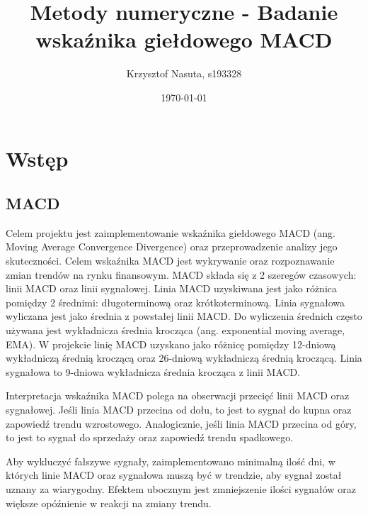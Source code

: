 \documentclass[12pt, a4paper]{article}
\title{Metody numeryczne - Badanie wskaźnika giełdowego MACD}
\author{Krzysztof Nasuta, s193328}
\date{\today}
\begin{document}
\maketitle

\section{Wstęp}

\subsection{MACD}
Celem projektu jest zaimplementowanie wskaźnika giełdowego MACD (ang. Moving Average Convergence Divergence)
oraz przeprowadzenie analizy jego skuteczności. Celem wskaźnika MACD jest wykrywanie oraz rozpoznawanie
zmian trendów na rynku finansowym. MACD składa się z 2 szeregów czasowych: linii MACD oraz linii sygnałowej.
Linia MACD uzyskiwana jest jako różnica pomiędzy 2 średnimi: długoterminową oraz krótkoterminową.
Linia sygnałowa wyliczana jest jako średnia z powstałej linii MACD. Do wyliczenia średnich często
używana jest wykładnicza średnia krocząca (ang. exponential moving average, EMA). W projekcie linię MACD uzyskano jako różnicę
pomiędzy 12-dniową wykładniczą średnią kroczącą oraz 26-dniową wykładniczą średnią kroczącą. Linia sygnałowa to 
9-dniowa wykładnicza średnia krocząca z linii MACD.

Interpretacja wskaźnika MACD polega na obserwacji przecięć linii MACD oraz sygnałowej. Jeśli linia MACD przecina od dołu,
to jest to sygnał do kupna oraz zapowiedź trendu wzrostowego. Analogicznie, jeśli linia MACD przecina od góry, to jest to sygnał
do sprzedaży oraz zapowiedź trendu spadkowego. 

Aby wykluczyć fałszywe sygnały, zaimplementowano minimalną ilość dni, w których linie MACD oraz sygnałowa muszą być w trendzie,
aby sygnał został uznany za wiarygodny. Efektem ubocznym jest zmniejszenie ilości sygnałów oraz większe opóźnienie 
w reakcji na zmiany trendu.
\end{document}
